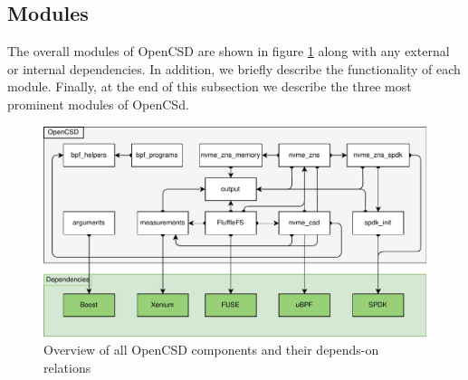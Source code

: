\subsection{Modules}

The overall modules of OpenCSD are shown in figure
\ref{figure:moduledependencies} along with any external or internal
dependencies. In addition, we briefly describe the functionality of each module.
Finally, at the end of this subsection we describe the three most prominent
modules of OpenCSd.


\begin{figure}
    \centering
	\includegraphics[width=1\textwidth]{resources/images/module-dependencies.pdf}
	\caption{Overview of all OpenCSD components and their depends-on relations}
    \label{figure:moduledependencies}
\end{figure}

